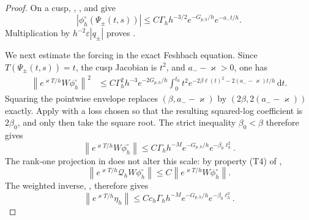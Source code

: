\documentclass[11pt]{article}
\newcommand{\eps}{\varepsilon}
\newcommand{\dd}{\,\mathrm d}
\newcommand{\cQ}{\mathcal Q}
\newcommand{\norm}[1]{\left\|#1\right\|}
\begin{document}
\begin{proof}
On a cusp, ,
, and  give
\[
 |\phi_h^\circ(\Psi_\pm(t,s))|
 \le C\Gamma_hh^{-3/2}e^{-G_{p,h}/h}e^{-a_-t/h}.
\]
Multiplication by $h^{-2}\eps|q_\pm|$ proves
.

We next estimate the forcing in the exact Feshbach equation.  Since
$T(\Psi_\pm(t,s))=t$, the cusp Jacobian is $t^2$, and
$a_--\varkappa>0$, one has
\begin{align}
 \norm{e^{\varkappa T/h}W\phi_h^\circ}^2
 &\le C\Gamma_h^2h^{-3}e^{-2G_{p,h}/h}
 \int_0^{t_0}t^2
 e^{-2\beta\ell(t)^2-2(a_--\varkappa)t/h}\dd t.
 \label{eq:weighted-source-integral}
\end{align}
Squaring the pointwise envelope replaces $(\beta,a_--\varkappa)$ by
$(2\beta,2(a_--\varkappa))$ exactly.  Apply  with
a loss chosen so that the resulting squared-log coefficient is $2\beta_0$,
and only then take the square root.  The strict inequality
$\beta_0<\beta$ therefore gives
\begin{equation}\label{eq:weighted-source-norm}
 \norm{e^{\varkappa T/h}W\phi_h^\circ}
 \le C\Gamma_hh^{-M}e^{-G_{p,h}/h}e^{-\beta_0\ell_h^2}.
\end{equation}
The rank-one projection in  does not alter this scale:
by property \textup{(T4)} of ,
\[
 \norm{e^{\varkappa T/h}\cQ_hW\phi_h^\circ}
 \le C\norm{e^{\varkappa T/h}W\phi_h^\circ}.
\]
The weighted inverse, , therefore gives
\begin{equation}\label{eq:eta-weighted-L2}
 \norm{e^{\varkappa T/h}\eta_h}
 \le Cc_h\Gamma_hh^{-M}e^{-G_{p,h}/h}e^{-\beta_0\ell_h^2}.
\end{equation}


\end{proof}
\end{document}
